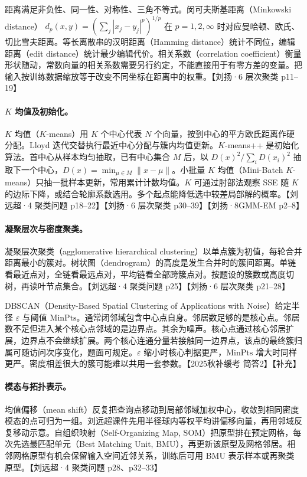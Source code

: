 \documentclass[UTF8,a4paper,zihao=-4,fontset=fandol]{ctexrep}
\begin{document}
距离满足非负性、同一性、对称性、三角不等式。闵可夫斯基距离（Minkowski distance）
$d_p(x,y)=(\sum_j|x_j-y_j|^p)^{1/p}$ 在 $p=1,2,\infty$ 时对应曼哈顿、欧氏、切比雪夫距离。等长离散串的汉明距离（Hamming distance）统计不同位，编辑距离（edit distance）统计最少编辑代价。相关系数（correlation coefficient）衡量形状随动，常数向量的相关系数需要另行约定，不能直接用于有零方差的变量。把输入按训练数据缩放等于改变不同坐标在距离中的权重。【刘扬·6 层次聚类 p11–19】

\paragraph{$K$ 均值及初始化。}
$K$ 均值（$K$-means）用 $K$ 个中心代表 $N$ 个向量，按到中心的平方欧氏距离作硬分配。Lloyd 迭代交替执行最近中心分配与簇内均值更新。$K$-means++ 是初始化算法。首中心从样本均匀抽取，已有中心集合 $M$ 后，以 $D(x)^2/\sum_i D(x_i)^2$ 抽取下一个中心，$D(x)=\min_{\mu\in M}\|x-\mu\|$。小批量 $K$ 均值（Mini-Batch $K$-means）只抽一批样本更新，常用累计计数均值。$K$ 可通过肘部法观察 SSE 随 $K$ 的边际下降，或结合轮廓系数选用。多个起点能降低选中较差局部解的概率。【刘远超·4 聚类问题 p18–22】【刘扬·6 层次聚类 p30–39】【刘扬·8GMM-EM p2–8】

\paragraph{凝聚层次与密度聚类。}
凝聚层次聚类（agglomerative hierarchical clustering）以单点簇为初值，每轮合并距离最小的簇对。树状图（dendrogram）的高度是发生合并时的簇间距离。单链看最近点对，全链看最远点对，平均链看全部跨簇点对。按题设的簇数或高度切树，再读叶节点集合。【刘远超·4 聚类问题 p25】【刘扬·6 层次聚类 p21–28】

DBSCAN（Density-Based Spatial Clustering of Applications with Noise）给定半径 $\varepsilon$ 与阈值 $\mathrm{MinPts}$。通常闭邻域包含中心点自身。邻居数足够的是核心点。邻居数不足但进入某个核心点邻域的是边界点。其余为噪声。核心点通过核心邻居扩展，边界点不会继续扩展。两个核心连通分量若接触同一边界点，该点的最终簇归属可随访问次序变化，题面可规定。$\varepsilon$ 缩小时核心判据更严，$\mathrm{MinPts}$ 增大时同样更严。密度相差很大的簇可能难以共用一套参数。【2025秋补缓考 简答2】【补充】

\paragraph{模态与拓扑表示。}
均值偏移（mean shift）反复把查询点移动到局部邻域加权中心，收敛到相同密度模态的点可归为一组。刘远超课件先用半径球内等权平均讲偏移向量，再用邻域反复移动示意。自组织映射（Self-Organizing Map, SOM）把原型排在预定网格，每次先选最匹配单元（Best Matching Unit, BMU），再更新该原型及网格邻居。相邻网格原型有机会保留输入空间近邻关系，训练后可用 BMU 表示样本或再聚类原型。【刘远超·4 聚类问题 p28、p32–33】
\end{document}
